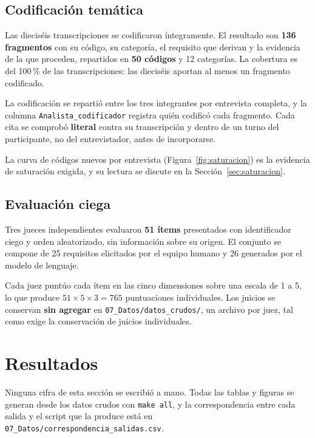 \documentclass[11pt,a4paper]{article}
\begin{document}
\subsection{Codificaci\'on tem\'atica}

Las diecis\'eis transcripciones se codificaron \'integramente. El resultado son
\textbf{136 fragmentos} con su c\'odigo, su categor\'ia, el requisito que derivan y la
evidencia de la que proceden, repartidos en \textbf{50 c\'odigos} y 12 categor\'ias. La
cobertura es del 100\,\% de las transcripciones: las diecis\'eis aportan al menos un
fragmento codificado.

La codificaci\'on se reparti\'o entre los tres integrantes por entrevista completa, y la
columna \texttt{Analista\_codificador} registra qui\'en codific\'o cada fragmento. Cada
cita se comprob\'o \textbf{literal} contra su transcripci\'on y dentro de un turno del
participante, no del entrevistador, antes de incorporarse.

La curva de c\'odigos nuevos por entrevista (Figura~\ref{fig:saturacion}) es la
evidencia de saturaci\'on exigida, y su lectura se discute en la
Secci\'on~\ref{sec:saturacion}.

\subsection{Evaluaci\'on ciega}

Tres jueces independientes evaluaron \textbf{51 \'items} presentados con identificador
ciego y orden aleatorizado, sin informaci\'on sobre su origen. El conjunto se compone de
25 requisitos elicitados por el equipo humano y 26 generados por el modelo de lenguaje.

Cada juez punt\'uo cada \'item en las cinco dimensiones sobre una escala de 1 a 5, lo
que produce $51 \times 5 \times 3 = 765$ puntuaciones individuales. Los juicios se
conservan \textbf{sin agregar} en \texttt{07\_Datos/datos\_crudos/}, un archivo por
juez, tal como exige la conservaci\'on de juicios individuales.

\section{Resultados}

Ninguna cifra de esta secci\'on se escribi\'o a mano. Todas las tablas y figuras se
generan desde los datos crudos con \texttt{make all}, y la correspondencia entre cada
salida y el script que la produce est\'a en
\texttt{07\_Datos/correspondencia\_salidas.csv}.
\end{document}
